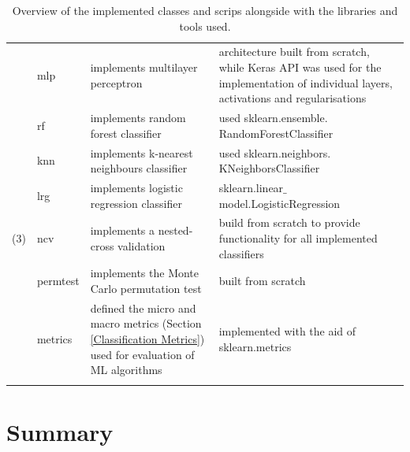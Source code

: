 \begin{longtable}{|p{}|p{}|p{}|p{}|}
                  & mlp                & implements multilayer perceptron                                                                                & architecture built from scratch, while Keras API was used for the implementation of individual layers, activations and regularisations         \\

                  & rf                 & implements random forest classifier                                                                             & used   sklearn.ensemble. RandomForestClassifier                                                                                                \\
                  & knn                & implements k-nearest neighbours classifier                                                                      & used sklearn.neighbors. KNeighborsClassifier                                                                                                   \\
                  & lrg                & implements logistic regression classifier                                                                       & sklearn.linear$\_$model.LogisticRegression                                                                                                     \\

  \hline

  (3)             & ncv                & implements a nested-cross validation                                                                            & build from scratch to provide functionality for all implemented classifiers                                                                    \\

                  & permtest           & implements the Monte Carlo permutation test                                                                     & built from scratch                                                                                                                             \\

                  & metrics            & defined the micro and macro metrics (Section \ref{Classification Metrics}) used for evaluation of ML algorithms & implemented with the aid of sklearn.metrics                                                                                                    \\


  \hline
  \caption[Repository Overview]{Overview of the implemented classes and scrips alongside with the libraries and tools used.}
  \label{repo_overview}
\end{longtable} \bigskip


\section{Summary}


